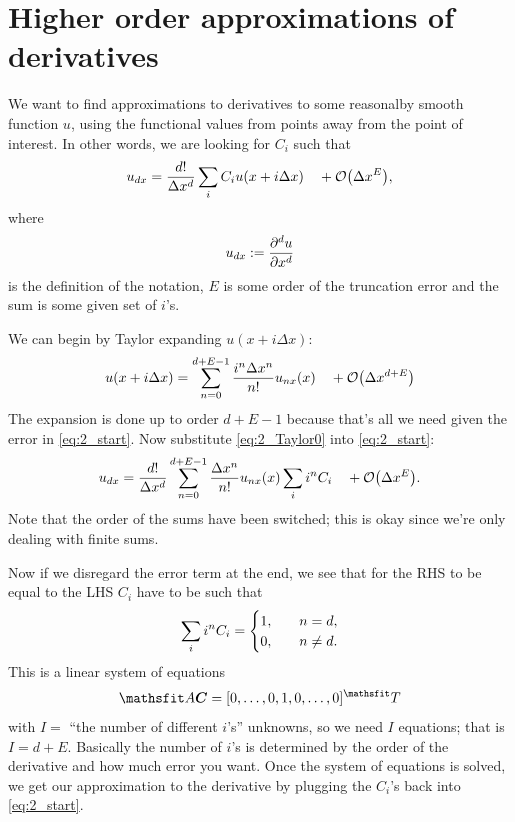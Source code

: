 \documentclass[11pt,letter, swedish, english
]{article}
\begin{document}
\section{Higher order approximations of derivatives}
\newcommand{\Dx}{\ensuremath{\Delta{x}}}
We want to find approximations to derivatives to some reasonalby
smooth function $u$, using the functional values from points away from
the point of interest. In other words, we are looking for $C_i$ such
that\footnotemark{}
\begin{equation}\label{eq:2_start}
u_{dx}=\frac{d!}{\Dx^d} \sum_i C_i u(x+i\Dx) \quad+\order{\Dx^E},
\end{equation}
where
\begin{equation}
u_{dx}:=\pdv[d]{u}{x}
\end{equation}
is the definition of the notation, $E$ is some order of the truncation
error and the sum is some given set of $i$'s.


We can begin by Taylor expanding $u(x+i\Dx)$:
\begin{equation}\label{eq:2_Taylor0}
u(x+i\Dx) = \sum_{n=0}^{d+E-1}
\frac{i^n\Dx^n}{n!} u_{nx}(x)
\quad+\order{\Dx^{d+E}}
\end{equation}
The expansion is done up to order $d+E-1$ because that's all we need
given the error in \eqref{eq:2_start}. Now substitute
\eqref{eq:2_Taylor0} into \eqref{eq:2_start}: 
\begin{equation}
u_{dx}=\frac{d!}{\Dx^d} \sum_{n=0}^{d+E-1}
\frac{\Dx^n}{n!} u_{nx}(x) \sum_i i^nC_i 
\quad+\order{\Dx^E}.
\end{equation}
Note that the order of the sums have been switched; this is okay since
we're only dealing with finite sums. 

Now if we disregard the error term at the end, we see that for the RHS
to be equal to the LHS $C_i$ have to be such that\footnotemark{}
\begin{equation}
\sum_i i^nC_i=
\begin{cases}
1\qcomma&n=d,\\
0,& n\neq d.
\end{cases}
\end{equation}
This is a linear system of equations 
\begin{equation}
\mathsf{A}\vb*{C}=[0, \ldots, 0, 1, 0, \ldots, 0]^\mathsfrm{T}
\end{equation}
with $I=$ ``the number of different
$i$'s'' unknowns, so we need $I$ equations; that is $I=d+E$. Basically
the number of $i$'s is determined by the order of the derivative and
how much error you want. 
Once the system of equations is solved, we get our approximation to
the derivative by plugging the $C_i$'s back into \eqref{eq:2_start}.
\end{document}
